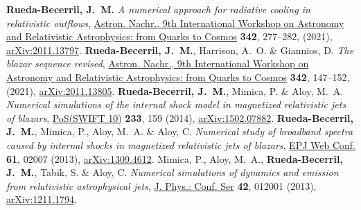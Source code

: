 \renewcommand{\refname}{Proceedings}
\setcounter{num}{0}
\renewcommand{\MyNbOfPub}{5}%
\renewcommand*{\bibliographyitemlabel}{\arabic{enumiv}.}
\begin{thebibliography}{99}
   \textbf{Rueda-Becerril, J.~M.} \emph{A numerical approach for radiative cooling in relativistic outflows}, \href{https://doi.org/10.1002/asna.202113919}{Astron. Nachr., 9th International Workshop on Astronomy and Relativistic Astrophysics: from Quarks to Cosmos} \textbf{342}, 277--282, (2021), \href{https://arxiv.org/abs/2011.13797}{arXiv:2011.13797}.
   \textbf{Rueda-Becerril, J.~M.}, Harrison, A.~O. \& Giannios, D. \emph{The blazar sequence revised}, \href{https://doi.org/10.1002/asna.202113919}{Astron. Nachr., 9th International Workshop on Astronomy and Relativistic Astrophysics: from Quarks to Cosmos} \textbf{342}, 147--152, (2021), \href{https://arxiv.org/abs/2011.13805}{arXiv:2011.13805}.
   \textbf{Rueda-Becerril, J.~M.}, Mimica, P. \& Aloy, M.~A. \emph{Numerical simulations of the internal shock model in magnetized relativistic jets of blazars}, \href{https://doi.org/10.22323/1.233.0159}{PoS(SWIFT 10)} \textbf{233}, 159 (2014), \href{https://arxiv.org/abs/1502.07882}{arXiv:1502.07882}.
   \textbf{Rueda-Becerril, J.~M.}, Mimica, P., Aloy, M.~A. \& Aloy, C. \emph{Numerical study of broadband spectra caused by internal shocks in magnetized relativistic jets of blazars}, \href{https://doi.org/10.1051/epjconf/20136102007}{EPJ Web Conf.} \textbf{61}, 02007 (2013), \href{https://arxiv.org/abs/1309.4612}{arXiv:1309.4612}.
   Mimica, P., Aloy, M.~A., \textbf{Rueda-Becerril, J.~M.}, Tabik, S. \& Aloy, C. \emph{Numerical simulations of dynamics and emission from relativistic astrophysical jets}, \href{https://doi.org/10.1088/1742-6596/454/1/012001}{J. Phys.: Conf. Ser} \textbf{42}, 012001 (2013), \href{https://arxiv.org/abs/1211.1794}{arXiv:1211.1794}.
\end{thebibliography}





%

